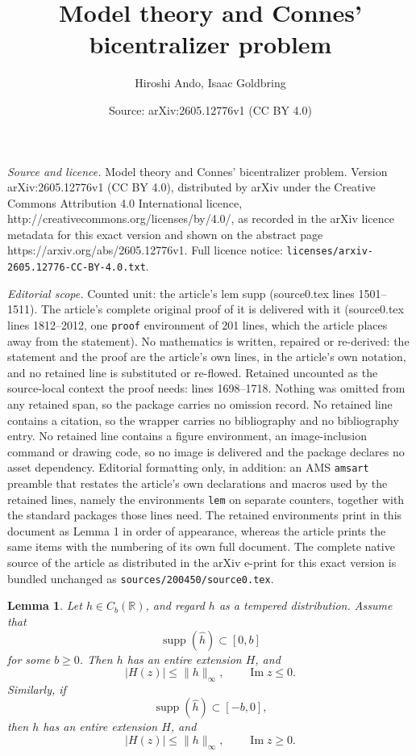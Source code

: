 \documentclass[10pt,a4paper]{amsart}
\title{Model theory and Connes' bicentralizer problem}
\author{Hiroshi Ando, Isaac Goldbring}
\date{Source: arXiv:2605.12776v1 (CC BY 4.0)}
\newtheorem{lem}{Lemma}
\begin{document}
\maketitle

\noindent\emph{Source and licence.} Model theory and Connes' bicentralizer problem. Version arXiv:2605.12776v1 (CC BY 4.0), distributed by arXiv under the Creative Commons Attribution 4.0 International licence, http://creativecommons.org/licenses/by/4.0/, as recorded in the arXiv licence metadata for this exact version and shown on the abstract page https://arxiv.org/abs/2605.12776v1. Full licence notice: \texttt{licenses/arxiv-2605.12776-CC-BY-4.0.txt}.\par\smallskip

\noindent\textit{Editorial scope.} Counted unit: the article's lem supp (source0.tex lines 1501--1511). The article's complete original proof of it is delivered with it (source0.tex lines 1812--2012, one \texttt{proof} environment of 201 lines, which the article places away from the statement). No mathematics is written, repaired or re-derived: the statement and the proof are the article's own lines, in the article's own notation, and no retained line is substituted or re-flowed.  Retained uncounted as the source-local context the proof needs: lines 1698--1718.  Nothing was omitted from any retained span, so the package carries no omission record.  No retained line contains a citation, so the wrapper carries no bibliography and no bibliography entry.  No retained line contains a figure environment, an image-inclusion command or drawing code, so no image is delivered and the package declares no asset dependency.  Editorial formatting only, in addition: an AMS \texttt{amsart} preamble that restates the article's own declarations and macros used by the retained lines, namely the environments \texttt{lem} on separate counters, together with the standard packages those lines need.  The retained environments print in this document as Lemma 1 in order of appearance, whereas the article prints the same items with the numbering of its own full document.  The complete native source of the article as distributed in the arXiv e-print for this exact version is bundled unchanged as \texttt{sources/200450/source0.tex}.
\begin{lem}\label{lem one-sided spec estimate}
Let \(h\in C_b(\mathbb R)\), and regard \(h\) as a tempered distribution. Assume
that
\[
        \operatorname{supp}(\widehat h)\subset [0,b]
\]
for some \(b\ge 0\). Then \(h\) has an entire extension \(H\), and
\[
        |H(z)|\le \|h\|_\infty,
        \qquad \operatorname{Im}z\le 0.
\]
Similarly, if
\[
        \operatorname{supp}(\widehat h)\subset [-b,0],
\]
then \(h\) has an entire extension \(H\), and
\[
        |H(z)|\le \|h\|_\infty,
        \qquad \operatorname{Im}z\ge 0.
\]
\end{lem}
\end{document}
